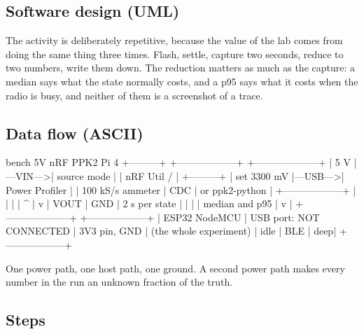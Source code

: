 \subsection*{Software design (UML)}


The activity is deliberately repetitive, because the value of the lab comes from doing the
same thing three times. Flash, settle, capture two seconds, reduce to two numbers, write
them down. The reduction matters as much as the capture: a median says what the state
normally costs, and a p95 says what it costs when the radio is busy, and neither of them is
a screenshot of a trace.

\subsection*{Data flow (ASCII)}

\begin{asciiart}
  bench 5V                 nRF PPK2                      Pi 4
  +---------+          +------------------+          +--------------------+
  |   5 V   |---VIN--->| source mode      |          | nRF Util /         |
  +---------+          |   set 3300 mV    |---USB--->|   Power Profiler   |
                       | 100 kS/s ammeter |   CDC    |   or ppk2-python   |
                       +------------------+          |        |           |
                              |    ^                 |        v           |
                            VOUT   | GND             | 2 s per state      |
                              |    |                 | median and p95     |
                              v    |                 +--------------------+
                       +------------------+
                       | ESP32 NodeMCU    |      USB port:  NOT CONNECTED
                       |   3V3 pin, GND   |      (the whole experiment)
                       | idle | BLE | deep|
                       +------------------+

  One power path, one host path, one ground.  A second power path makes
  every number in the run an unknown fraction of the truth.
\end{asciiart}

\subsection*{Steps}

